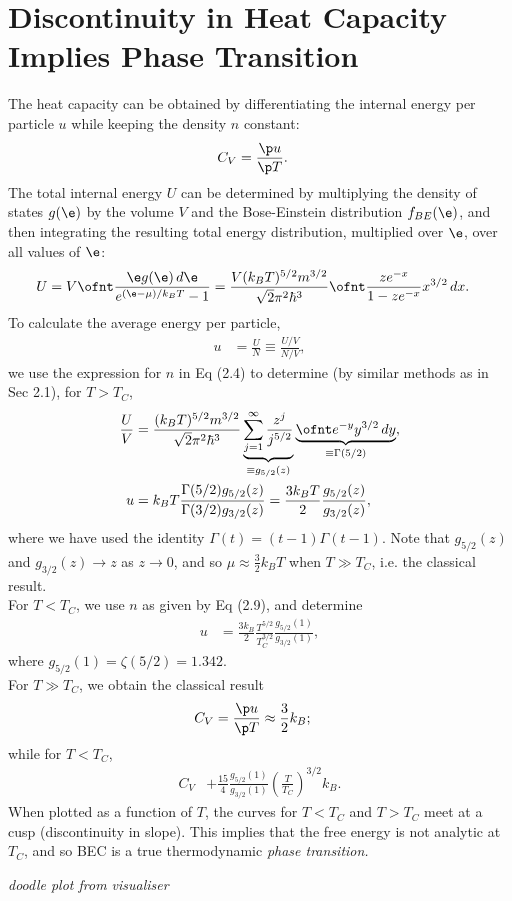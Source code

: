 \documentclass[qo.tex]{subfiles}
\begin{document}
\section{Discontinuity in Heat Capacity Implies Phase Transition}
The heat capacity can be obtained by differentiating the internal energy per particle $u$ while keeping the density $n$ constant:
\begin{align}
    C_V &= \frac{\p u}{\p T}.
\end{align}
The total internal energy $U$ can be determined by multiplying the density of states $g(\e)$ by the volume $V$ and the Bose-Einstein distribution $f_{BE}(\e)$, and then integrating the resulting total energy distribution, multiplied over $\e$, over all values of $\e$:
\begin{align}
    U &= V\ofnt \frac{\e g(\e)\,d\e}{e^{(\e-\mu)/k_BT}-1} = \frac{V(k_BT)^{5/2}m^{3/2}}{\sqrt{2}\pi^2\hbar^3}\ofnt \frac{ze^{-x}}{1-ze^{-x}}x^{3/2}\,dx.
\end{align}
To calculate the average energy per particle, 
\begin{align}
    u &= \frac{U}{N} \equiv \frac{U/V}{N/V},
\end{align}
we use the expression for $n$ in Eq (2.4) to determine (by similar methods as in Sec 2.1), for $T>T_C$,
\begin{align}
    \frac{U}{V} &= \frac{(k_BT)^{5/2}m^{3/2}}{\sqrt{2}\pi^2\hbar^3}\underbrace{\sum_{j=1}^\infty\frac{z^j}{j^{5/2}}}_{\equiv g_{5/2}(z)}\underbrace{\ofnt e^{-y}y^{3/2}\,dy}_{\equiv \Gamma(5/2)},\\
    u &= k_BT\frac{\Gamma(5/2)g_{5/2}(z)}{\Gamma(3/2)g_{3/2}(z)} = \frac{3k_BT}{2}\frac{g_{5/2}(z)}{g_{3/2}(z)},
\end{align}
where we have used the identity $\Gamma(t)=(t-1)\Gamma(t-1)$.
Note that $g_{5/2}(z)$ and $g_{3/2}(z) \to z$ as $z\to0$, and so $\mu\approx \frac32 k_BT$ when $T\gg T_C$, i.e. the classical result. \\
For $T<T_C$, we use $n$ as given by Eq (2.9), and determine
\begin{align}
    u &= \frac{3k_B}{2}\frac{T^{5/2}}{T^{3/2}_C}\frac{g_{5/2}(1)}{g_{3/2}(1)},
\end{align}
where $g_{5/2}(1)=\zeta(5/2)=1.342$.\\
For $T\gg T_C$, we obtain the classical result
\begin{align}
    C_V &= \frac{\p u}{\p T} \approx \frac32 k_B;
\end{align}
while for $T<T_C$,
\begin{align}
    C_V &+ \frac{15}{4}\frac{g_{5/2}(1)}{g_{3/2}(1)}\left(\frac{T}{T_C}\right)^{3/2}k_B.
\end{align}
When plotted as a function of $T$, the curves for $T<T_C$ and $T>T_C$ meet at a cusp (discontinuity in slope).
This implies that the free energy is not analytic at $T_C$, and so BEC is a true thermodynamic \emph{phase transition.}

\emph{doodle plot from visualiser}
\end{document}
